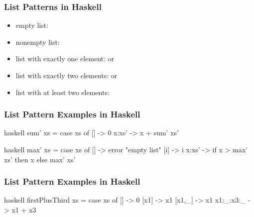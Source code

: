 \documentclass[dvipsnames]{beamer}
\theoremstyle{plain}
\begin{document}
\begin{frame}[fragile]
  \frametitle{List Patterns in Haskell}

  \begin{itemize}
    \item empty list: 
    \item nonempty list: 
    \item list with exactly one element:  or
    \item list with exactly two elements:  or
    \item list with at least two elements: 
  \end{itemize}
\end{frame}

\begin{frame}[fragile]
  \frametitle{List Pattern Examples in Haskell}

  \begin{example}
    \begin{pygments}{haskell}
sum' xs =
    case xs of
      [] -> 0
      x:xs' -> x + sum' xs'
    \end{pygments}
  \end{example}

  \pause
  \begin{example}
    \begin{pygments}{haskell}
max' xs =
    case xs of
      [] -> error "empty list"
      [i] -> i
      x:xs' -> if x > max' xs' then x else max' xs'
    \end{pygments}
  \end{example}
\end{frame}

\begin{frame}[fragile]
  \frametitle{List Pattern Examples in Haskell}

  \begin{example}
    \pause
    \begin{pygments}{haskell}
firstPlusThird xs =
    case xs of
      [] -> 0
      [x1] -> x1
      [x1,_] -> x1
      x1:_:x3:_ -> x1 + x3
    \end{pygments}
  \end{example}
\end{frame}
\end{document}
